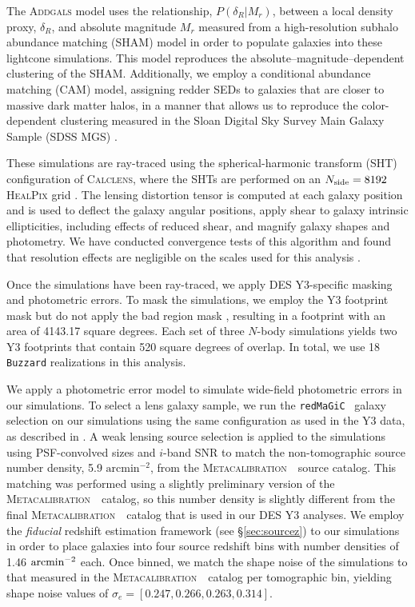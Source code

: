 \documentclass[aps, prd,twocolumn,superscriptaddress,nofootinbib,preprintnumbers]{revtex4-1}
\newcommand{\redmagic}{\texttt{redMaGiC} }
\newcommand{\buzzard}{\texttt{Buzzard} }
\newcommand{\metacal}{{\textsc{Metacalibration}~}}
\begin{document}
The \textsc{Addgals} model uses the relationship, $P(\delta_{R}|M_r)$, between a local density proxy, $\delta_{R}$, and absolute magnitude $M_r$ measured from a high-resolution subhalo abundance matching (SHAM) model in order to populate galaxies into these lightcone simulations. This model reproduces the absolute--magnitude--dependent clustering of the SHAM. Additionally, we employ a conditional abundance matching (CAM) model, assigning redder SEDs to galaxies that are closer to massive dark matter halos, in a manner that allows us to reproduce the color-dependent clustering measured in the Sloan Digital Sky Survey Main Galaxy Sample (SDSS MGS) \citep{Addgals, DeRose2020b}. 

These simulations are ray-traced using the spherical-harmonic transform (SHT) configuration of \textsc{Calclens}, where the SHTs are performed on an $N_{\rm side}=8192$ \textsc{HealPix} grid \citep{Becker2013}. The lensing distortion tensor is computed at each galaxy position and is used to deflect the galaxy angular positions, apply shear to galaxy intrinsic ellipticities, including effects of reduced shear, and magnify galaxy shapes and photometry. We have conducted convergence tests of this algorithm and found that resolution effects are negligible on the scales used for this analysis \citep{DeRose2019}.

Once the simulations have been ray-traced, we apply DES Y3-specific masking and photometric errors. To mask the simulations, we employ the Y3 footprint mask but do not apply the bad region mask \citep{y3-gold}, resulting in a footprint with an area of 4143.17 square degrees. Each set of three $N$-body simulations yields two Y3 footprints that contain 520 square degrees of overlap. In total, we use 18 \buzzard realizations in this analysis. 

We apply a photometric error model to simulate wide-field photometric errors in our simulations. To select a lens galaxy sample, we run the \redmagic\ galaxy selection on our simulations using the same configuration as used in the Y3 data, as described in \citet*{y3-galaxyclustering}. A weak lensing source selection is applied to the simulations using PSF-convolved sizes and $i$-band SNR to match the non-tomographic source number density, 5.9 $\textrm{arcmin}^{-2}$, from the \metacal\ source catalog. This matching was performed using a slightly preliminary version of the \metacal\ catalog, so this number density is slightly different from the final \metacal\ catalog that is used in our DES Y3 analyses. We employ the \textit{fiducial} redshift estimation framework (see \S\ref{sec:sourcez}) to our simulations in order to place galaxies into four source redshift bins with number densities of 1.46 $\rm arcmin^{-2}$ each. Once binned, we match the shape noise of the simulations to that measured in the \metacal\ catalog per tomographic bin, yielding shape noise values of $\sigma_{e}=[0.247, 0.266, 0.263, 0.314]$.
\end{document}
